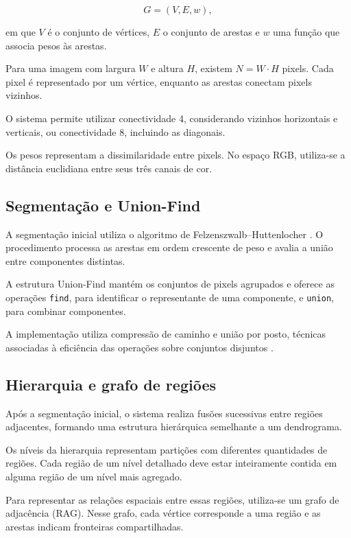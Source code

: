 \documentclass[12pt]{article}
\begin{document}
\begin{equation}
G=(V,E,w),
\end{equation}

em que $V$ é o conjunto de vértices, $E$ o conjunto
de arestas e $w$ uma função que associa pesos às arestas.

Para uma imagem com largura $W$ e altura $H$, existem
$N=W\cdot H$ pixels. Cada pixel é representado por
um vértice, enquanto as arestas conectam pixels vizinhos.

O sistema permite utilizar conectividade 4, considerando
vizinhos horizontais e verticais, ou conectividade 8,
incluindo as diagonais.

Os pesos representam a dissimilaridade entre pixels.
No espaço RGB, utiliza-se a distância euclidiana entre
seus três canais de cor.

\subsection{Segmentação e Union-Find}

A segmentação inicial utiliza o algoritmo de
Felzenszwalb--Huttenlocher \cite{felzenszwalb2004}.
O procedimento processa as arestas em ordem crescente
de peso e avalia a união entre componentes distintas.

A estrutura Union-Find mantém os conjuntos de pixels
agrupados e oferece as operações \texttt{find},
para identificar o representante de uma componente,
e \texttt{union}, para combinar componentes.

A implementação utiliza compressão de caminho e
união por posto, técnicas associadas à eficiência
das operações sobre conjuntos disjuntos
\cite{tarjan1975,cormen2022}.

\subsection{Hierarquia e grafo de regiões}

Após a segmentação inicial, o sistema realiza fusões
sucessivas entre regiões adjacentes, formando uma
estrutura hierárquica semelhante a um dendrograma.

Os níveis da hierarquia representam partições com
diferentes quantidades de regiões. Cada região de
um nível detalhado deve estar inteiramente contida
em alguma região de um nível mais agregado.

Para representar as relações espaciais entre essas
regiões, utiliza-se um grafo de adjacência (RAG).
Nesse grafo, cada vértice corresponde a uma região
e as arestas indicam fronteiras compartilhadas.
\end{document}
